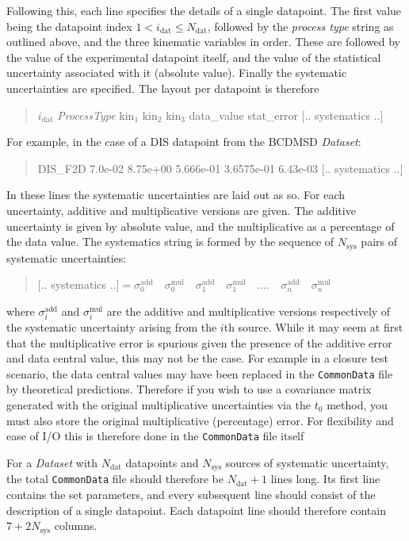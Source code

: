 \documentclass[11pt]{article}
\begin{document}
Following this, each line specifies the details of a single datapoint. The first value being the datapoint index $1< i_{\text{dat}} \leq N_{\mathrm{dat}}$, followed by the \emph{process type} string as outlined above, and the three kinematic variables in order. These are followed by the value of the experimental datapoint itself, and the value of the statistical uncertainty associated with it (absolute value). Finally the systematic uncertainties are specified. The layout per datapoint is therefore
\begin{quotation}\noindent
$i_{\mathrm{dat}}$   \emph{ProcessType} kin$_1$ kin$_2$ kin$_3$ data\_value stat\_error  $[..$ systematics $..]$ 
\end{quotation}
For example, in the case of a DIS datapoint from the BCDMSD \emph{Dataset}:
\begin{quotation}    DIS\_F2D 7.0e-02   8.75e+00   5.666e-01   3.6575e-01   6.43e-03 $[..$ systematics $..]$ 
\end{quotation}
In these lines the systematic uncertainties are laid out as so. For each uncertainty, additive and multiplicative versions are given. The additive uncertainty is given by absolute value, and the multiplicative as a percentage of the data value. The systematics string is formed by the sequence of $N_{\text{sys}}$ pairs of systematic uncertainties:
\begin{quotation}\noindent
$[..$ systematics $..] =  \sigma^{\mathrm{add}}_0 \quad  \sigma^{\mathrm{mul}}_0\quad \sigma^{\mathrm{add}}_1 \quad \sigma^{\mathrm{mul}}_1 \quad....\quad \sigma^{\mathrm{add}}_n  \quad\sigma^{\mathrm{mul}}_n$
\end{quotation}
where $\sigma^{\mathrm{add}}_i$ and $\sigma^{\mathrm{mul}}_i$ are the additive and multiplicative versions respectively of the systematic uncertainty arising from the $i$th source. While it may seem at first that the multiplicative error is spurious given the presence of the additive error and data central value, this may not be the case. For example in a closure test scenario, the data central values may have been replaced in the {\tt CommonData} file by theoretical predictions. Therefore if you wish to use a covariance matrix generated with the original multiplicative uncertainties via the $t_0$ method, you must also store the original multiplicative (percentage) error. For flexibility and ease of I/O this is therefore done in the {\tt CommonData} file itself

For a \emph{Dataset} with $N_{\text{dat}}$ datapoints and $N_{\text{sys}}$ sources of systematic uncertainty, the total {\tt CommonData} file should therefore be $N_{\text{dat}}+1$ lines long. Its first line contains the set parameters, and every subsequent line should consist of the description of a single datapoint. Each datapoint line should therefore contain $7 + 2N_{\text{sys}}$ columns.
\end{document}
